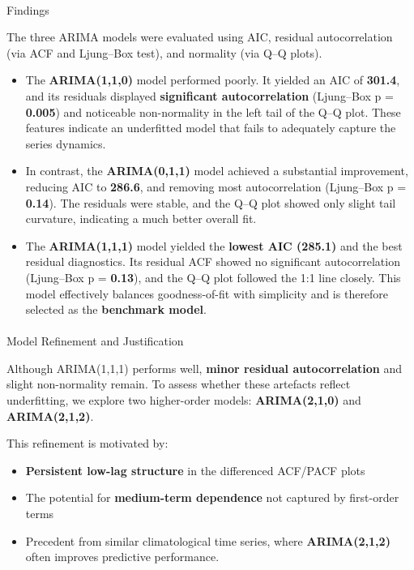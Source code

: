 \documentclass[
  11pt,
]{article}
\makeatletter
\let\oldparagraph\paragraph
\renewcommand{\paragraph}{
    \@ifstar
      \xxxParagraphStar
      \xxxParagraphNoStar
  }
\newcommand{\xxxParagraphStar}[1]{\oldparagraph*{#1}\mbox{}}
\newcommand{\xxxParagraphNoStar}[1]{\oldparagraph{#1}\mbox{}}
\makeatother
\begin{document}
\paragraph{Findings}\label{findings}

The three ARIMA models were evaluated using AIC, residual
autocorrelation (via ACF and Ljung--Box test), and normality (via Q--Q
plots).

\begin{itemize}
\item
  The \textbf{ARIMA(1,1,0)} model performed poorly. It yielded an AIC of
  \textbf{301.4}, and its residuals displayed \textbf{significant
  autocorrelation} (Ljung--Box p = \textbf{0.005}) and noticeable
  non-normality in the left tail of the Q--Q plot. These features
  indicate an underfitted model that fails to adequately capture the
  series dynamics.
\item
  In contrast, the \textbf{ARIMA(0,1,1)} model achieved a substantial
  improvement, reducing AIC to \textbf{286.6}, and removing most
  autocorrelation (Ljung--Box p = \textbf{0.14}). The residuals were
  stable, and the Q--Q plot showed only slight tail curvature,
  indicating a much better overall fit.
\item
  The \textbf{ARIMA(1,1,1)} model yielded the \textbf{lowest AIC
  (285.1)} and the best residual diagnostics. Its residual ACF showed no
  significant autocorrelation (Ljung--Box p = \textbf{0.13}), and the
  Q--Q plot followed the 1:1 line closely. This model effectively
  balances goodness-of-fit with simplicity and is therefore selected as
  the \textbf{benchmark model}.
\end{itemize}

\paragraph{Model Refinement and
Justification}\label{model-refinement-and-justification}

Although ARIMA(1,1,1) performs well, \textbf{minor residual
autocorrelation} and slight non-normality remain. To assess whether
these artefacts reflect underfitting, we explore two higher-order
models: \textbf{ARIMA(2,1,0)} and \textbf{ARIMA(2,1,2)}.

This refinement is motivated by:

\begin{itemize}
\item
  \textbf{Persistent low-lag structure} in the differenced ACF/PACF
  plots
\item
  The potential for \textbf{medium-term dependence} not captured by
  first-order terms
\item
  Precedent from similar climatological time series, where
  \textbf{ARIMA(2,1,2)} often improves predictive performance.
\end{itemize}
\end{document}
